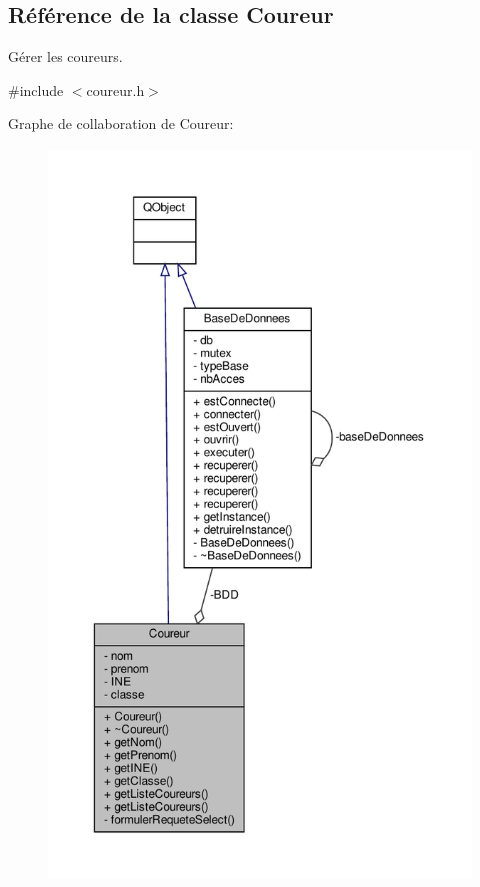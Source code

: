 \hypertarget{class_coureur}{}\subsection{Référence de la classe Coureur}
\label{class_coureur}


Gérer les coureurs.  




{\ttfamily \#include $<$coureur.\+h$>$}



Graphe de collaboration de Coureur\+:\nopagebreak
\begin{figure}[H]
\begin{center}
\leavevmode
\includegraphics[height=550pt]{class_coureur__coll__graph}
\end{center}
\end{figure}
